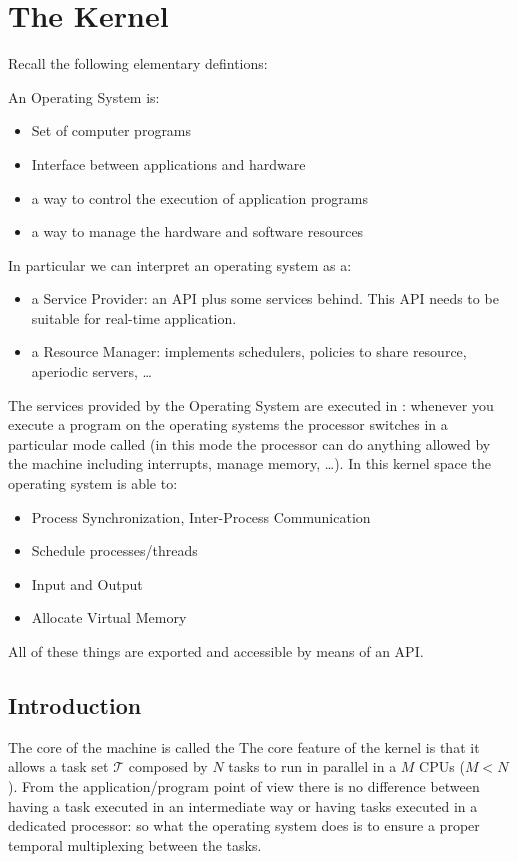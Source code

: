 \chapter{The Kernel}

Recall the following elementary defintions:
{
    An Operating System is:
    \begin{itemize}
        \item Set of computer programs
        \item Interface between applications and hardware
        \item a way to control the execution of application programs
        \item a way to manage the hardware and software resources
    \end{itemize}
}
In particular we can interpret an operating system as a:
\begin{itemize}
    \item a Service Provider: an API plus some services behind. This API needs to be suitable for real-time application.
    \item a Resource Manager: implements schedulers, policies to share resource, aperiodic servers, \dots
\end{itemize}
The services provided by the Operating System are executed in : whenever you execute a program on the operating systems the processor switches in a particular mode called  (in this mode the processor can do anything allowed by the machine including interrupts, manage memory, \dots).
In this kernel space the operating system is able to:
\begin{itemize}
    \item Process Synchronization, Inter-Process Communication
    \item Schedule processes/threads
    \item Input and Output
    \item Allocate Virtual Memory
\end{itemize} 
All of these things are exported and accessible by means of an API.

\section{Introduction}
The core of the machine is called the 
The core feature of the kernel is that it allows a task set $\mathcal{T}$ composed by $N$ tasks to run in parallel in a $M$ CPUs ($M < N$). From the application/program point of view there is no difference between having a task executed in an intermediate way or having tasks executed in a dedicated processor: so what the operating system does is to ensure a proper temporal multiplexing between the tasks.

